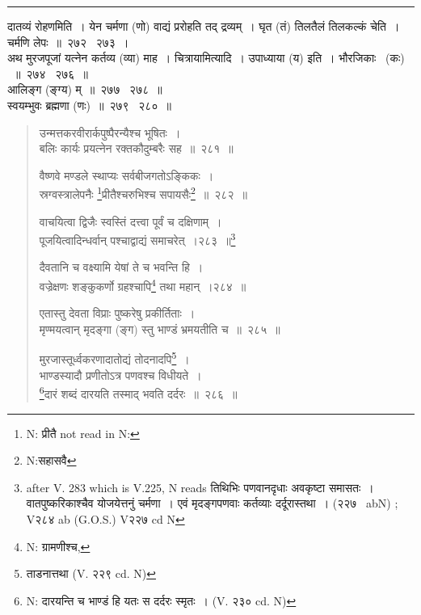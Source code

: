 \documentclass[11pt, openany]{book}
\begin{document}
\hrule
 
\vspace{2mm}
दातव्यं रोहणमिति~। येन चर्मणा (णो) वाद्यं प्ररोहति तद् द्रव्यम्~। घृत (तं) तिलतैलं तिलकल्कं चेति~। चर्मणि लेपः~॥~२७२ \textendash\ २७३~।\\

अथ मुरजपूजां यत्नेन कर्तव्य (व्या) माह~। चित्रायामित्यादि~। उपाध्याया (य) इति~। भौरजिकाः \textendash\  (कः) ~॥~२७४ \textendash\ २७६~॥\\

आलिङ्ग (ङ्ग्य) म्~॥~२७७ \textendash\ २७८~॥\\

स्वयम्भुवः ब्रह्मणा (णः)~॥~२७९ \textendash\ २८०~॥

\newpage

\begin{quote}
{\na  उन्मत्तकरवीरार्कपुष्पैरन्यैश्च भूषितः~।\\
 बलिः कार्यः प्रयत्नेन रक्तकौदुम्बरैः सह~॥~२८१~॥

 वैष्णवे मण्डले स्थाप्यः सर्वबीजगतोऽङ्किकः~।\\
 स्रग्वस्त्रालेपनैः \renewcommand{\thefootnote}{1}\footnote{N: प्रीतै not read in N:}प्रीतैश्चरुभिश्च सपायसैः\renewcommand{\thefootnote}{2}\footnote{N:सहासवै}~॥~२८२~॥

 वाचयित्वा द्विजैः स्वस्तिं दत्त्वा पूर्वं च दक्षिणाम्~।\\
 पूजयित्वादिन्धर्वान् पश्चाद्वाद्यं समाचरेत्~।२८३~॥\renewcommand{\thefootnote}{3}\footnote{after V. 283 which is V.225, N reads तिथिभिः पणवानदृधाः अवकृष्टा समासतः~। वातपुष्करिकाश्चैव योजयेत्तनुं चर्मणा~। एवं मृदङ्गपणवाः कर्तव्याः दर्दूरास्तथा~।  (२२७ \textendash\  abN) ; V२८४ ab (G.O.S.) V२२७ cd N}

 दैवतानि च वक्ष्यामि येषां ते च भवन्ति हि~।\\
 वज्रेक्षणः शङ्कुकर्णो ग्रहश्चापि\renewcommand{\thefootnote}{4}\footnote{N: ग्रामणीश्च,} तथा महान्~।२८४~॥

 एतास्तु देवता विप्राः पुष्करेषु प्रकीर्तिताः~।\\
 मृण्मयत्वान् मृदङ्गा (ङ्ग) स्तु भाण्डं भ्रमयतीति च~॥~२८५~॥

 मुरजास्तूर्ध्वकरणादातोद्यं तोदनादपि\renewcommand{\thefootnote}{5}\footnote{ताडनात्तथा  (V. २२९ cd. N)}~।\\
 भाण्डस्यादौ प्रणीतोऽत्र पणवश्च विधीयते~।\\
 \renewcommand{\thefootnote}{6}\footnote{N: दारयन्ति च भाण्डं हि यतः स दर्दरः स्मृतः~। (V. २३० cd. N)}दारं शब्दं दारयति तस्माद् भवति दर्दरः~॥~२८६~॥}
\end{quote}
\end{document}
